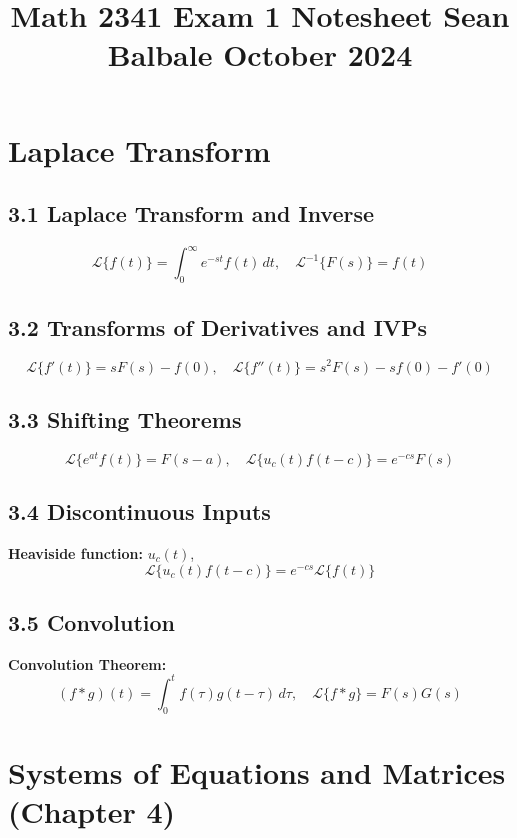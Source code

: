 \documentclass[10pt]{article}
\title{\raggedright \large Math 2341 Exam 1 Notesheet \hfill Sean Balbale \hfill October 2024 \vspace{-3em}}
\date{}
\begin{document}
\maketitle
\begin{multicols}{2}

\section*{Laplace Transform}
\subsection*{3.1 Laplace Transform and Inverse}
\[
\mathcal{L}\{f(t)\} = \int_0^\infty e^{-st}f(t) \, dt, \quad \mathcal{L}^{-1}\{F(s)\} = f(t)
\]

\subsection*{3.2 Transforms of Derivatives and IVPs}
\[
\mathcal{L}\{f'(t)\} = sF(s) - f(0), \quad \mathcal{L}\{f''(t)\} = s^2F(s) - sf(0) - f'(0)
\]

\subsection*{3.3 Shifting Theorems}
\[
\mathcal{L}\{e^{at}f(t)\} = F(s-a), \quad \mathcal{L}\{u_c(t)f(t-c)\} = e^{-cs}F(s)
\]

\subsection*{3.4 Discontinuous Inputs}
\textbf{Heaviside function:} \( u_c(t) \), \\
\[
\mathcal{L}\{u_c(t)f(t-c)\} = e^{-cs}\mathcal{L}\{f(t)\}
\]

\subsection*{3.5 Convolution}
\textbf{Convolution Theorem:}
\[
(f * g)(t) = \int_0^t f(\tau)g(t-\tau) \, d\tau, \quad \mathcal{L}\{f * g\} = F(s)G(s)
\]

\section*{Systems of Equations and Matrices (Chapter 4)}

\end{multicols}
\end{document}
